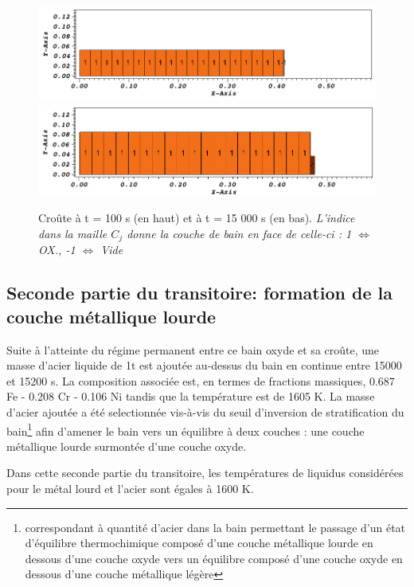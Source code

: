 \begin{figure}[H]
\centering
\includegraphics[width=\textwidth, keepaspectratio=true]{Figures/coriumCrust_100.png}\\
\includegraphics[width=\textwidth, keepaspectratio=true]{Figures/coriumCrust_15000.png}
\caption{Croûte à t = 100 s (en haut) et à t = 15 000 s (en bas). \textit{L'indice dans la maille $C_j$ donne la couche de bain en face de celle-ci : 1 $\Leftrightarrow$ OX., -1 $\Leftrightarrow$ Vide}}
\label{fig:croutes_1}
\end{figure}

\subsection{Seconde partie du transitoire: formation de la couche métallique lourde}\label{sect:transit}

Suite à l'atteinte du régime permanent entre ce bain oxyde et sa croûte, une masse d'acier liquide de 1t est ajoutée au-dessus du bain en continue entre 15000 et 15200 s. La composition associée est, en termes de fractions massiques, 0.687 Fe - 0.208 Cr - 0.106 Ni tandis que la température est de 1605 K. La masse d'acier ajoutée a été selectionnée vis-à-vis du seuil d'inversion de stratification du bain\footnote{correspondant à quantité d'acier dans la bain permettant le passage d'un état d'équilibre thermochimique composé d'une couche métallique lourde en dessous d'une couche oxyde vers un équilibre composé d'une couche oxyde en dessous d'une couche métallique légère} afin d'amener le bain vers un équilibre à deux couches : une couche métallique lourde surmontée d'une couche oxyde.

Dans cette seconde partie du transitoire, les températures de liquidus considérées pour le métal lourd et l'acier sont égales à 1600 K.

